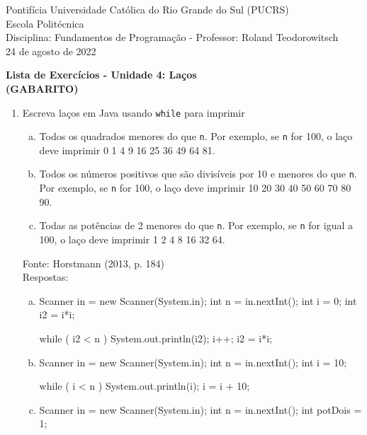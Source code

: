 \documentclass[onecolumn,a4paper,10pt]{report}
\newcommand{\+}{\, + \,}
\newcommand{\<}{\hspace*{-0.4cm}}
\begin{document}
\singlespacing

\begin{center}
Pontifícia Universidade Católica do Rio Grande do Sul (PUCRS)\\
Escola Politécnica\\
Disciplina: Fundamentos de Programação - Professor: Roland Teodorowitsch\\
24 de agosto de 2022
\end{center}

\begin{center}
\textbf{Lista de Exercícios - Unidade 4: Laços\\(GABARITO)}
\end{center}

\begin{enumerate}[1.]

\item Escreva laços em Java usando \texttt{while} para imprimir
\begin{enumerate}[a)]
	\item Todos os quadrados menores do que \texttt{n}. Por exemplo, se \texttt{n} for 100, o laço deve imprimir 0 1 4 9 16 25 36 49 64 81.
	\item Todos os números positivos que são divisíveis por 10 e menores do que \texttt{n}. Por exemplo, se \texttt{n} for 100, o laço deve imprimir 10 20 30 40 50 60 70 80 90.
	\item Todas as potências de 2 menores do que \texttt{n}. Por exemplo, se \texttt{n} for igual a 100, o laço deve imprimir 1 2 4 8 16 32 64.
\end{enumerate}
{\tiny Fonte: Horstmann (2013, p. 184)}\\
Respostas:
\begin{enumerate}[a)]
	\item
\begin{javacode}
Scanner in = new Scanner(System.in);
int n = in.nextInt();
int i = 0;
int i2 = i*i;

while ( i2 < n ) {
   System.out.println(i2);
   i++;
   i2 = i*i;
}
\end{javacode}
	\item
\begin{javacode}
Scanner in = new Scanner(System.in);
int n = in.nextInt();
int i = 10;

while ( i < n ) {
   System.out.println(i);
   i = i + 10;
}
\end{javacode}
	\item
\begin{javacode}
Scanner in = new Scanner(System.in);
int n = in.nextInt();
int potDois = 1;


\end{javacode}
\end{enumerate}
\end{enumerate}
\end{document}
